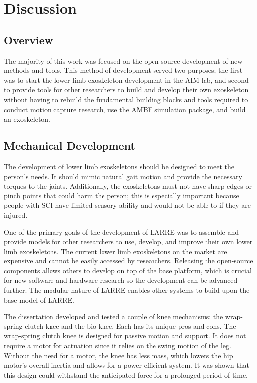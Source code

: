 \chapter{Discussion}

\section{Overview}

The majority of this work was focused on the open-source development of new methods and tools. This method of development served two purposes; the first was to start the lower limb exoskeleton development in the AIM lab, and second to provide tools for other researchers to build and develop their own exoskeleton without having to rebuild the fundamental building blocks and tools required to conduct motion capture research, use the AMBF simulation package, and build an exoskeleton. 


\section{Mechanical Development}

The development of lower limb exoskeletons should be designed to meet the person's needs. It should mimic natural gait motion and provide the necessary torques to the joints. Additionally, the exoskeletons must not have sharp edges or pinch points that could harm the person; this is especially important because people with SCI have limited sensory ability and would not be able to if they are injured. 

One of the primary goals of the development of LARRE was to assemble and provide models for other researchers to use, develop, and improve their own lower limb exoskeletons. The current lower limb exoskeletons on the market are expensive and cannot be easily accessed by researchers. Releasing the open-source components allows others to develop on top of the base platform, which is crucial for new software and hardware research so the development can be advanced further. The modular nature of LARRE enables other systems to build upon the base model of LARRE. 

The dissertation developed and tested a couple of knee mechanisms; the wrap-spring clutch knee and the bio-knee. Each has its unique pros and cons. The wrap-spring clutch knee is designed for passive motion and support. It does not require a motor for actuation since it relies on the swing motion of the leg. Without the need for a motor, the knee has less mass, which lowers the hip motor's overall inertia and allows for a power-efficient system. It was shown that this design could withstand the anticipated force for a prolonged period of time.   

